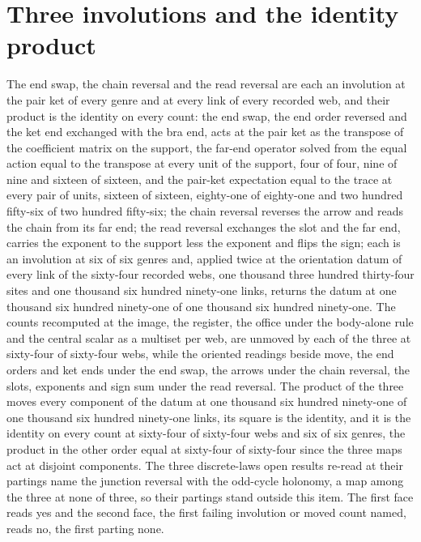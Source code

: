 \section{Three involutions and the identity product}\label{mod:III-6-D542993-nvli-t1}
\begin{chtheorem}\label{box:III-6-D542993-nvli-t1:1}
The end swap, the chain reversal and the read reversal are each an involution at the pair ket of every genre and at every link of every recorded web, and their product is the identity on every count: the end swap, the end order reversed and the ket end exchanged with the bra end, acts at the pair ket as the transpose of the coefficient matrix on the support, the far-end operator solved from the equal action equal to the transpose at every unit of the support, four of four, nine of nine and sixteen of sixteen, and the pair-ket expectation equal to the trace at every pair of units, sixteen of sixteen, eighty-one of eighty-one and two hundred fifty-six of two hundred fifty-six; the chain reversal reverses the arrow and reads the chain from its far end; the read reversal exchanges the slot and the far end, carries the exponent to the support less the exponent and flips the sign; each is an involution at six of six genres and, applied twice at the orientation datum of every link of the sixty-four recorded webs, one thousand three hundred thirty-four sites and one thousand six hundred ninety-one links, returns the datum at one thousand six hundred ninety-one of one thousand six hundred ninety-one. The counts recomputed at the image, the register, the office under the body-alone rule and the central scalar as a multiset per web, are unmoved by each of the three at sixty-four of sixty-four webs, while the oriented readings beside move, the end orders and ket ends under the end swap, the arrows under the chain reversal, the slots, exponents and sign sum under the read reversal. The product of the three moves every component of the datum at one thousand six hundred ninety-one of one thousand six hundred ninety-one links, its square is the identity, and it is the identity on every count at sixty-four of sixty-four webs and six of six genres, the product in the other order equal at sixty-four of sixty-four since the three maps act at disjoint components. The three discrete-laws open results re-read at their partings name the junction reversal with the odd-cycle holonomy, a map among the three at none of three, so their partings stand outside this item. The first face reads yes and the second face, the first failing involution or moved count named, reads no, the first parting none.
\end{chtheorem}
